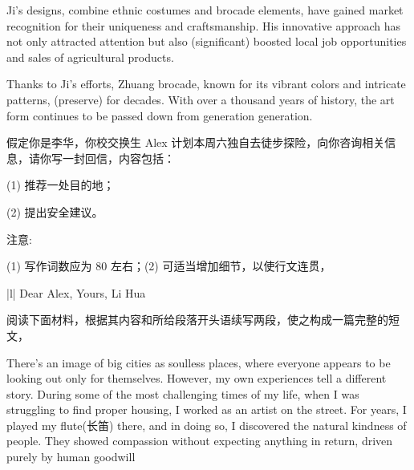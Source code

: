 \documentclass{英语试卷}
\begin{document}
\par Ji's designs,  combine ethnic costumes and brocade elements, have gained market recognition for their uniqueness and craftsmanship. His innovative approach has not only attracted attention but also (significant) boosted local job opportunities and sales of agricultural products.\par
\par Thanks to Ji's efforts, Zhuang brocade, known for its vibrant colors and intricate patterns,  (preserve) for decades. With over a thousand years of history, the art form continues to be passed down from generation  generation.\par
{}
\par 假定你是李华，你校交换生 Alex 计划本周六独自去徒步探险，向你咨询相关信息，请你写一封回信，内容包括：\par
\par (1) 推荐一处目的地；\par
\par (2) 提出安全建议。\par
\par 注意:\par
\par (1) 写作词数应为 80 左右；(2) 可适当增加细节，以使行文连贯，\par
\par\vspace{0.4em}
\begin{center}\begin{tabular}{{|l|}}
\hline
Dear Alex, Yours, Li Hua \\
\hline
\end{tabular}\end{center}
\vspace{0.4em}
\par 阅读下面材料，根据其内容和所给段落开头语续写两段，使之构成一篇完整的短文，\par
\par There's an image of big cities as soulless places, where everyone appears to be looking out only for themselves. However, my own experiences tell a different story. During some of the most challenging times of my life, when I was struggling to find proper housing, I worked as an artist on the street. For years, I played my flute(长笛) there, and in doing so, I discovered the natural kindness of people. They showed compassion without expecting anything in return, driven purely by human goodwill\par
\end{document}
